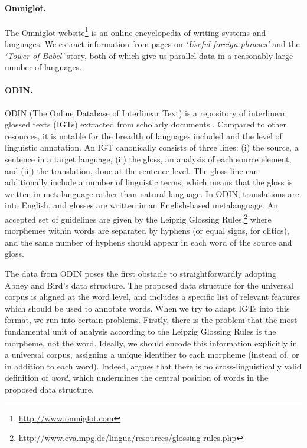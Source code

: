 \paragraph{Omniglot.}

The Omniglot website\footnote{\url{http://www.omniglot.com}} is an online encyclopedia of writing systems and languages. We extract information from pages on \emph{`Useful foreign phrases'} and the \emph{`Tower of Babel'} story, both of which give us parallel data in a reasonably large number of languages. %

\paragraph{ODIN.} \label{sec:odin}

ODIN (The Online Database of Interlinear Text) is a repository of
interlinear glossed texts (IGTs) extracted from scholarly documents
\cite{lewis2006odin,lewis2010odin}.  Compared to other resources, it
is notable for the breadth of languages included and the level of
linguistic annotation.  An IGT canonically consists of three lines:
(i) the source, a sentence in a target language, (ii) the gloss, an
analysis of each source element, and (iii) the translation,
done at the sentence level. The gloss line can additionally include a
number of linguistic terms, which means that the gloss 
is written in metalanguage rather than natural language.  In ODIN, translations are into English, and glosses
are written in an English-based metalanguage.  An accepted set of
guidelines are given by the Leipzig Glossing
Rules,\footnote{\url{http://www.eva.mpg.de/lingua/resources/glossing-rules.php}}
where morphemes within words are separated by hyphens (or equal signs,
for clitics), and the same number of hyphens should appear in each
word of the source and gloss.

The data from ODIN poses the first obstacle to straightforwardly adopting Abney and Bird's data structure. 
The proposed data structure for the universal corpus is aligned at the word level, and includes a specific list of relevant features which should be used to annotate words. When we try to adapt IGTs into this format, we run into certain problems.  Firstly, there is the problem that the most fundamental unit of analysis according to the Leipzig Glossing Rules is the morpheme, not the word.  Ideally, we should encode this information explicitly in a universal corpus, assigning a unique identifier to each morpheme (instead of, or in addition to each word). Indeed,  argues that there is no cross-linguistically valid definition of \textit{word}, which undermines the central position of words in the proposed data structure.

